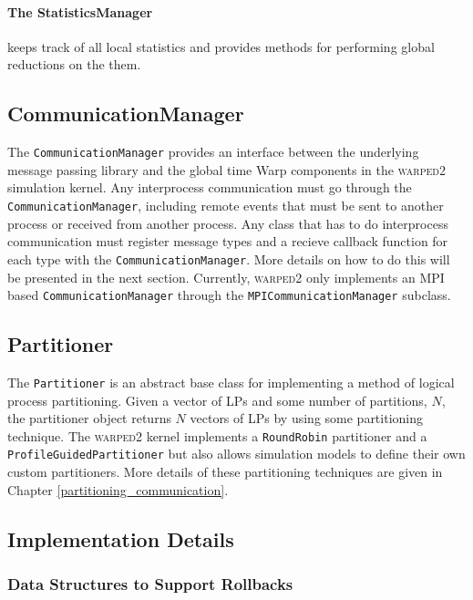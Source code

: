 \documentclass[11pt]{book}
\begin{document}
\paragraph{The StatisticsManager} keeps track of all local statistics and provides methods for
performing global reductions on the them.  

\subsection{CommunicationManager}

The \texttt{CommunicationManager} provides an interface between the underlying message passing
library and the global time Warp components in the \textsc{warped2} simulation kernel.  Any
interprocess communication must go through the \texttt{CommunicationManager}, including remote
events that must be sent to another process or received from another process.  Any class that has to
do interprocess communication must register message types and a recieve callback function for each
type with the \texttt{CommunicationManager}.  More details on how to do this will be presented in
the next section. Currently, \textsc{warped2} only implements an MPI based
\texttt{CommunicationManager} through the \texttt{MPICommunicationManager} subclass.

\subsection{Partitioner}

The \texttt{Partitioner} is an abstract base class for implementing a method of logical process
partitioning.  Given a vector of LPs and some number of partitions, $N$, the partitioner object
returns $N$ vectors of LPs by using some partitioning technique.  The \textsc{warped2} kernel
implements a \texttt{RoundRobin} partitioner and a \texttt{ProfileGuidedPartitioner} but also allows
simulation models to define their own custom partitioners.  More details of these partitioning
techniques are given in Chapter \ref{partitioning_communication}.

\subsection{Implementation Details}

\subsubsection[Rollbacks \& Cancellation]{Data Structures to Support Rollbacks}
\end{document}
